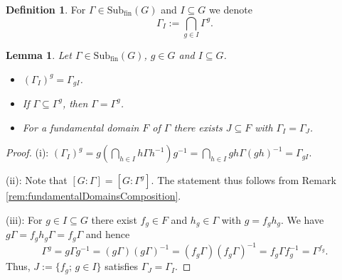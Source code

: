 \documentclass[12pt, reqno]{amsart}
\newtheorem{lemma}[theorem]{Lemma}
\theoremstyle{definition}
\newtheorem{definition}[theorem]{Definition}
\theoremstyle{remark}
\numberwithin{equation}{section}
\theoremstyle{theorem}
\theoremstyle{remark}
\def\subfin{{\operatorname{Sub_{fin}}}}
\begin{document}
\begin{definition}
    For $\Gamma\in \subfin(G)$ and $I\subseteq G$ we denote \[\Gamma_I:=\bigcap_{g\in I}\Gamma^g.\]     
\end{definition}

\begin{lemma}
\label{lem:conjugationInsights}
    Let $\Gamma\in \subfin(G)$, $g\in G$ and $I\subseteq G$. 
    \begin{itemize}
        \item[(i)] $(\Gamma_I)^g=\Gamma_{gI}$. 
        \item[(ii)] If $\Gamma\subseteq \Gamma^g$, then $\Gamma=\Gamma^g$. 
        \item[(iii)] For a fundamental domain $F$ of $\Gamma$ there exists $J\subseteq F$ with $\Gamma_I=\Gamma_J$. 
    \end{itemize}
\end{lemma}
\begin{proof}
(i):
    $(\Gamma_I)^g=g\left(\bigcap_{h\in I} h\Gamma h^{-1}\right)g^{-1}=\bigcap_{h\in I} gh\Gamma (gh)^{-1}=\Gamma_{gI}.$

(ii): 
    Note that $[G\colon \Gamma]=[G\colon \Gamma^g]$.
    The statement thus follows from Remark \ref{rem:fundamentalDomainsComposition}. 

(iii): 
    For $g\in I\subseteq G$ there exist $f_g\in F$ and $h_g\in \Gamma$ with $g=f_gh_g$. We have $g\Gamma=f_gh_g\Gamma=f_g\Gamma$ and hence
    \[\Gamma^g=g\Gamma g^{-1}=(g\Gamma)(g\Gamma)^{-1}=(f_g\Gamma)(f_g\Gamma)^{-1}=f_g\Gamma f_g^{-1}=\Gamma^{f_g}.\]
    Thus, $J:=\{f_g;\, g\in I\}$ satisfies $\Gamma_J=\Gamma_I$. 
\end{proof}
\end{document}
